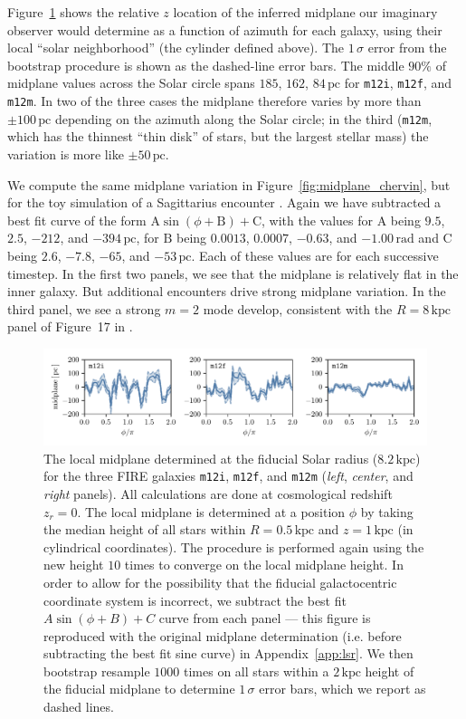 \documentclass[twocolumn]{aastex62}
\newcommand{\pc}{\text{pc}}
\newcommand{\kpc}{\text{kpc}}
\newcommand{\mi}{\texttt{m12i}}
\newcommand{\mf}{\texttt{m12f}}
\newcommand{\mm}{\texttt{m12m}}
\newcommand{\z}{z_r}
\begin{document}
Figure~\ref{fig:midplane} shows the relative $z$ location of the inferred
midplane our imaginary observer would determine as a function of azimuth for
each galaxy, using their local ``solar neighborhood'' (the cylinder defined
above). The $1\,\sigma$ error from the bootstrap procedure is shown as the
dashed-line error bars. The middle $90\%$ of midplane values across the Solar
circle spans $185$, $162$, $84\,\pc$ for \mi{}, \mf{}, and \mm{}. In two of
the three cases the midplane therefore varies by more than $\pm 100\,\pc$
depending on the azimuth along the Solar circle; in the third (\mm{}, which
has the thinnest ``thin disk'' of stars, but the largest stellar mass) the
variation is more like $\pm 50\,\pc$.

We compute the same midplane variation in Figure~\ref{fig:midplane_chervin},
but for the toy simulation of a Sagittarius encounter
\citep{2018MNRAS.481..286L}. Again we have subtracted a best fit curve of the
form $\text{A} \sin{\left(\phi + \text{B}\right)} + \text{C}$, with the values
for $\text{A}$ being $9.5$, $2.5$, $-212$, and $-394\,\pc$, for $\text{B}$
being $0.0013$, $0.0007$, $-0.63$, and $-1.00\,\text{rad}$ and $\text{C}$
being $2.6$, $-7.8$, $-65$, and $-53\,\pc$. Each of these values are for each
successive timestep. In the first two panels, we see that the midplane is
relatively flat in the inner galaxy. But additional encounters drive strong
midplane variation. In the third panel, we see a strong $m=2$ mode develop,
consistent with the $R=8\,\kpc$ panel of Figure~17 in
\citet{2018MNRAS.481..286L}.

\begin{figure}
\begin{center}
\includegraphics[width=\textwidth]{fig/midplane_fit.pdf}
\end{center}
\caption{The local midplane determined at the fiducial Solar radius
($8.2\,\kpc$) for the three FIRE galaxies \mi{}, \mf{}, and \mm{} ({\em left},
{\em center}, and {\em right} panels). All calculations are done at
cosmological redshift $\z =0$. The local midplane is determined at a position
$\phi$ by taking the median height of all stars within $R=0.5\,\kpc$ and
$z=1\,\kpc$ (in cylindrical coordinates). The procedure is performed again
using the new height $10$ times to converge on the local midplane height. In
order to allow for the possibility that the fiducial galactocentric coordinate
system is incorrect, we subtract the best fit $A\sin{(\phi+B)}+C$ curve from
each panel --- this figure is reproduced with the original midplane
determination (i.e. before subtracting the best fit sine curve) in
Appendix~\ref{app:lsr}. We then bootstrap resample $1000$ times on all stars
within a $2\,\kpc$ height of the fiducial midplane to determine $1\,\sigma $
error bars, which we report as dashed lines.}
\label{fig:midplane}
\end{figure}
\end{document}
